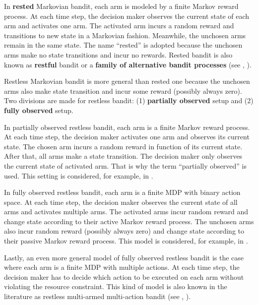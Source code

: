 In \textbf{rested} Markovian bandit, each arm is modeled by a finite Markov reward process. At each time step, the decision maker observes the current state of each arm and activates one arm.
The activated arm incurs a random reward and transitions to new state in a Markovian fashion.
Meanwhile, the unchosen arms remain in the same state.
The name ``rested'' is adopted because the unchosen arms make no state transitions and incur no rewards.
Rested bandit is also known as \textbf{restful} bandit or a \textbf{family of alternative bandit processes} (see \eg, \cite{gittins1979bandit,katehakis1987multi,duff1995q,tekin2010online,gittins2011multi}).

Restless Markovian bandit is more general than rested one because
the unchosen arms also make state transition and incur some reward (possibly always zero).
Two divisions are made for restless bandit: (1) \textbf{partially observed} setup and (2) \textbf{fully observed} setup.

In partially observed restless bandit, each arm is a finite Markov reward process.
At each time step, the decision maker activates one arm and observes its current state.
The chosen arm incurs a random reward in function of its current state.
After that, all arms make a state transition.
The decision maker only observes the current state of activated arm.
That is why the term ``partially observed'' is used.
This setting is considered, for example, in \cite{ahmad2009multi,ortner2012regret, jung2019regret, akbarzadeh2019dynamic, wang2020restless}.

In fully observed restless bandit, each arm is a finite MDP with binary action space.
At each time step, the decision maker observes the current state of all arms and activates multiple arms.
The activated arms incur random reward and change state according to their active Markov reward process.
The unchosen arms also incur random reward (possibly always zero) and change state according to their passive Markov reward process.
This model is considered, for example, in \cite{whittle1996optimal,akbarzadeh2019restless,gast2020exponential,dahiya2022scalable}.

Lastly, an even more general model of fully observed restless bandit is the case where each arm is a finite MDP with multiple actions.
At each time step, the decision maker has to decide which action to be executed on each arm without violating the resource constraint.
This kind of model is also known in the literature as restless multi-armed multi-action bandit (see \eg, \cite{hodge2015asymptotic,killian2021beyond}).

